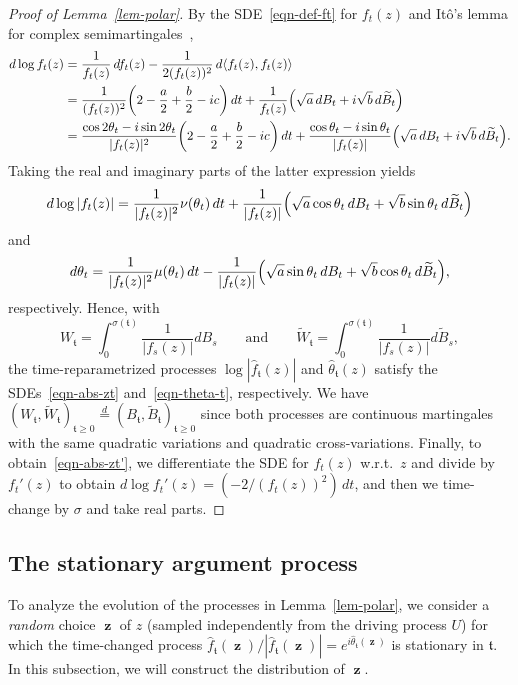 \documentclass[11pt]{article}
\theoremstyle{plain}
\theoremstyle{definition}
\numberwithin{equation}{section}
\newcommand{\eqb}{\begin{equation}}
\newcommand{\eqe}{\end{equation}}
\newcommand{\op}{\operatorname}
\newcommand{\la}{\langle}
\newcommand{\ra}{\rangle}
\newcommand{\eqD}{\overset{d}{=}}
\newcommand{\wt}{\widetilde}
\newcommand{\wh}{\widehat}
\newcommand{\zz}{{\op{\mathbf{z}}}}
\newcommand{\tz}{{\mathfrak t}}
\let\originalleft\left
\let\originalright\right
\renewcommand{\left}{\mathopen{}\mathclose\bgroup\originalleft}
\renewcommand{\right}{\aftergroup\egroup\originalright}
\begin{document}
\begin{proof}[Proof of Lemma~\ref{lem-polar}]
By the SDE~\eqref{eqn-def-ft} for $f_t(z)$ and It\^{o}'s lemma for complex semimartingales~\cite[Chapter II, Theorem 35]{protter}, 
\begin{align*}
d\log f_t(z) 
&= \frac{1}{f_t(z)} \, df_t(z) - \frac{1}{2 (f_t(z))^2} \, d\la f_t(z) , f_t(z) \ra  \notag\\
&=\frac{1}{(f_t(z))^2}\left(2 - \frac{a}{2} + \frac{b}{2} - i c \right) \, dt + \frac{1}{f_t(z)}\left(\sqrt{a} \, dB_t + i \sqrt{b} \, d\wt B_t \right)\\
&= \frac{\cos{2 \theta_t} - i \sin{2 \theta_t}}{|f_t(z)|^2} \left(2 - \frac{a}{2} + \frac{b}{2} - i c \right) \, dt + \frac{\cos{ \theta_t} - i \sin{\theta_t} }{|f_t(z)|} \left(\sqrt{a} \, dB_t + i \sqrt{b} \, d\wt B_t \right) .
\end{align*}
Taking the real and imaginary parts of the latter expression yields
\eqb
d\log|  f_t(z)| = \frac{1}{|f_t(z)|^2} \nu( \theta_t) \, dt + \frac{1}{|f_t(z)|} \left( \sqrt{a}\cos{ \theta_t} \, dB_t + \sqrt{b}\sin{ \theta_t} \, d\wt B_t \right)
\label{eqn-abs-zt-op}
\eqe
and
\eqb
d \theta_t = \frac{1}{|f_t(z)|^2} \mu( \theta_t) \, dt - \frac{1}{|f_t(z)|} \left(\sqrt{a}\sin{ \theta_t} \, dB_t + \sqrt{b}\cos{ \theta_t} \, d\wt B_t \right),
\label{eqn-theta-t-op}
\eqe
respectively.
Hence, with
\[
W_\tz = \int_0^{\sigma(\tz)} \frac{1}{|f_s(z)| } dB_s \qquad \text{and} \qquad \wt W_\tz = \int_0^{\sigma(\tz)} \frac{1}{|f_s(z)| } d\wt B_s,
\]
the time-reparametrized processes $\log|\wh f_\tz(z)| $ and $\wh \theta_\tz(z)$  satisfy the SDEs~\eqref{eqn-abs-zt} and~\eqref{eqn-theta-t}, respectively. 
We have $(W_\tz , \wt W_\tz)_{\tz\geq 0} \eqD (B_\tz , \wt B_\tz)_{\tz\geq 0}$ since both processes are continuous martingales with the same quadratic variations and quadratic cross-variations. 
Finally, to obtain~\eqref{eqn-abs-zt'}, we differentiate the SDE for $f_t(z)$ w.r.t.\ $z$ and divide by $f_t'(z)$ to obtain $d\log f_t'(z) = (-2/(f_t(z))^2) \,  dt$, and then we time-change by $\sigma$ and take real parts. 
\end{proof}






\subsection{The stationary argument process}
\label{sec-stationary}
 
To analyze the evolution of the processes in Lemma~\ref{lem-polar}, we consider a \emph{random} choice $\zz$ of $z$ (sampled independently from the driving process $U$) for which the time-changed process $\wh f_\tz(\zz) / |\wh f_\tz(\zz)| = e^{i  \wh \theta_\tz(\zz)}$ is stationary in $\tz$. In this subsection, we will construct the distribution of $\zz$. 
\end{document}
